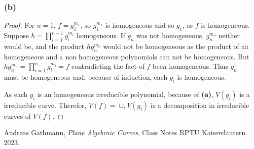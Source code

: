 \documentclass[11pt,a4paper]{article}
\begin{document}
\subsubsection*{(b)}
  \begin{proof}
    For $ n = 1 $, $ f = g_1^{m_1} $, so $ g_1^{m_1} $ is homogeneous and so $ g_1 $, as $ f $ is homogeneous. Suppose $ h = \prod_{i=1}^{n-1} g_i^{m_i} $ homogeneous. If $ g_n $ was not homogeneous, $ g_n^{m_n} $ neither would be, and the product $ h g_n^{m_n} $ would not be homogeneous as the product of an homogeneous and a non homogeneous polynomials can not be homogeneous. But $ h g_n^{m_n} = \prod_{i=1}^n g_i^{m_i} = f $ contradicting the fact of $ f $ been homogeneous. Thus $ g_n $ must be homogeneous and, because of induction, each $ g_i $ is homogeneous.

    \vspace{1mm}
    As each $ g_i $ is an homogeneous irreducible polynomial, because of {\bf (a)}, $ V(g_i) $ is a irreducible curve. Therefor, $ V(f) = \cup_i V(g_i) $ is a decomposition in irreducible curves of $ V(f) $.
  \end{proof}

\begin{thebibliography}{9}

  Andreas Gathmann,
  \textit{Plane Algebraic Curves},
  Class Notes RPTU Kaiserslautern 2023.
  
\end{thebibliography}
\end{document}
